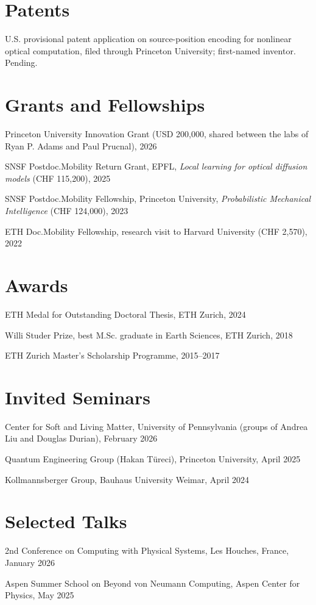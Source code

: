 \documentclass[11pt]{article}
\begin{document}
\section*{Patents}
U.S. provisional patent application on source-position encoding for nonlinear optical computation, filed through Princeton University; first-named inventor. Pending.

\section*{Grants and Fellowships}
Princeton University Innovation Grant (USD 200,000, shared between the labs of Ryan P. Adams and Paul Prucnal), 2026

SNSF Postdoc.Mobility Return Grant, EPFL, \emph{Local learning for optical diffusion models} (CHF 115,200), 2025

SNSF Postdoc.Mobility Fellowship, Princeton University, \emph{Probabilistic Mechanical Intelligence} (CHF 124,000), 2023

ETH Doc.Mobility Fellowship, research visit to Harvard University (CHF 2,570), 2022

\section*{Awards}
ETH Medal for Outstanding Doctoral Thesis, ETH Zurich, 2024

Willi Studer Prize, best M.Sc. graduate in Earth Sciences, ETH Zurich, 2018

ETH Zurich Master's Scholarship Programme, 2015--2017

\section*{Invited Seminars}
Center for Soft and Living Matter, University of Pennsylvania (groups of Andrea Liu and Douglas Durian), February 2026

Quantum Engineering Group (Hakan Türeci), Princeton University, April 2025

Kollmannsberger Group, Bauhaus University Weimar, April 2024

\section*{Selected Talks}
2nd Conference on Computing with Physical Systems, Les Houches, France, January 2026

Aspen Summer School on Beyond von Neumann Computing, Aspen Center for Physics, May 2025
\end{document}
